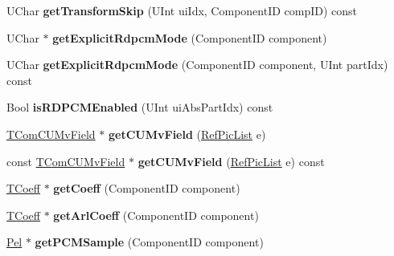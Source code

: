 \begin{DoxyCompactItemize}
U\+Char {\bfseries get\+Transform\+Skip} (U\+Int ui\+Idx, Component\+ID comp\+ID) const
\item 
\mbox{\label{class_t_com_data_c_u_a8ec0578d14c202ad322a0cbbdf6a3066}} 
U\+Char $\ast$ {\bfseries get\+Explicit\+Rdpcm\+Mode} (Component\+ID component)
\item 
\mbox{\label{class_t_com_data_c_u_a53912b1d4248172d44a9ea6c347af33b}} 
U\+Char {\bfseries get\+Explicit\+Rdpcm\+Mode} (Component\+ID component, U\+Int part\+Idx) const
\item 
\mbox{\label{class_t_com_data_c_u_aa0f85f6d5b6bc8d9366e68929fae4242}} 
Bool {\bfseries is\+R\+D\+P\+C\+M\+Enabled} (U\+Int ui\+Abs\+Part\+Idx) const
\item 
\mbox{\label{class_t_com_data_c_u_a701c3ede21631f332ee0edf4d2793889}} 
\hyperlink{class_t_com_c_u_mv_field}{T\+Com\+C\+U\+Mv\+Field} $\ast$ {\bfseries get\+C\+U\+Mv\+Field} (\hyperlink{_type_def_8h_a93cea48eb9dcfd661168dee82e41b384}{Ref\+Pic\+List} e)
\item 
\mbox{\label{class_t_com_data_c_u_aeac3fb134276d26a3f173df3487f08dd}} 
const \hyperlink{class_t_com_c_u_mv_field}{T\+Com\+C\+U\+Mv\+Field} $\ast$ {\bfseries get\+C\+U\+Mv\+Field} (\hyperlink{_type_def_8h_a93cea48eb9dcfd661168dee82e41b384}{Ref\+Pic\+List} e) const
\item 
\mbox{\label{class_t_com_data_c_u_a2f8657a9fdbe90af9d7be7f13e7e21f0}} 
\hyperlink{_type_def_8h_a5bdd3b17d14ed1978c366d2d958c0300}{T\+Coeff} $\ast$ {\bfseries get\+Coeff} (Component\+ID component)
\item 
\mbox{\label{class_t_com_data_c_u_abeebc336a66a206b45bbe8b49688f171}} 
\hyperlink{_type_def_8h_a5bdd3b17d14ed1978c366d2d958c0300}{T\+Coeff} $\ast$ {\bfseries get\+Arl\+Coeff} (Component\+ID component)
\item 
\mbox{\label{class_t_com_data_c_u_aa88aeaa11988f75909d9b2636330ad44}} 
\hyperlink{_type_def_8h_af92141699657699b4b547be0c8517541}{Pel} $\ast$ {\bfseries get\+P\+C\+M\+Sample} (Component\+ID component)
\item 

\end{DoxyCompactItemize}
